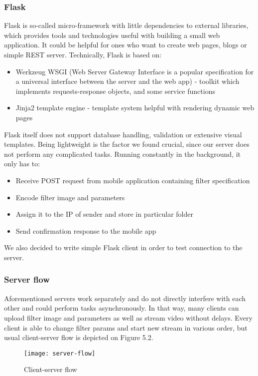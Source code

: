 \documentclass[../Main.tex]{subfiles}
\begin{document}
    \subsubsection{Flask}
    Flask is so-called micro-framework with little dependencies to external libraries, which provides tools and technologies useful with building a small web application. It could be helpful for ones who want to create web pages, blogs or simple REST server. 
    Technically, Flask is based on:
    \begin{itemize}
    \item Werkzeug WSGI (Web Server Gateway Interface is a popular specification for a universal interface between the  server and the web app) - toolkit which implements requests-response objects, and some service functions
    \item Jinja2 template engine - template system helpful with rendering dynamic web pages
    \end{itemize}
    Flask itself does not support database handling, validation or extensive visual templates. Being lightweight is the factor we found crucial, since our server does not perform any complicated tasks. Running constantly in the background, it only has to:
    \begin{itemize}
    \item Receive POST request from mobile application containing filter specification 
    \item Encode filter image and parameters
    \item Assign it to the IP of sender and store in particular folder
    \item Send confirmation response to the mobile app
    \end{itemize}
    We also decided to write simple Flask client in order to test connection to the server.
    
    
    \subsubsection{Server flow}
    Aforementioned servers work separately and do not directly interfere with each other and could perform tasks asynchronously. In that way, many clients can upload filter image and parameters as well as stream video without delays. Every client is able to change filter params and start new stream in various order, but usual client-server flow is depicted on Figure 5.2. 
    \begin{figure}[h]
    \centering
    \texttt{[image: server-flow]}
    \caption{Client-server flow}
    \end{figure}
    
\end{document}
